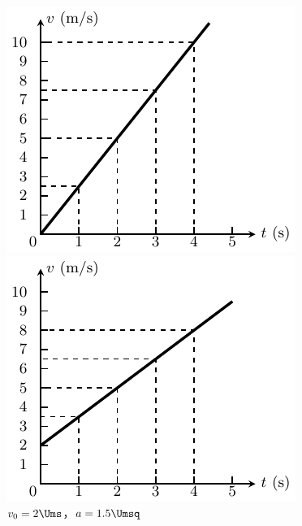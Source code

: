 \begin{figure}[htp]
\centering
    \begin{minipage}[t]{0.48\textwidth}
        \centering
        \includegraphics{fig/A/2-15.pdf}
        \caption{$v_0=0 $，$  a=2.5 \Umsq $}\label{fig_A_2-15}
    \end{minipage}
    \begin{minipage}[t]{0.48\textwidth}
        \centering
        \includegraphics{fig/A/2-16.pdf}
        \caption{$v_0=2 \Ums $，$  a=1.5 \Umsq $}\label{fig_A_2-16}
    \end{minipage}
\end{figure}

